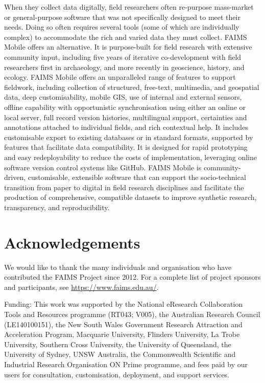 \documentclass[preprint,12pt, a4paper]{elsarticle}
\begin{document}
When they collect data digitally, field researchers often re-purpose mass-market or general-purpose software that was not specifically designed to meet their needs. Doing so often requires several tools (some of which are individually complex) to accommodate the rich and varied data they must collect. FAIMS Mobile offers an alternative. It is purpose-built for field research with extensive community input, including five years of iterative co-development with field researchers first in archaeology, and more recently in geoscience, history, and ecology. FAIMS Mobile offers an unparalleled range of features to support fieldwork, including collection of structured, free-text, multimedia, and geospatial data, deep customisability, mobile GIS, use of internal and external sensors, offline capability with opportunistic synchronisation using either an online or local server, full record version histories, multilingual support, certainties and annotations attached to individual fields, and rich contextual help. It includes customisable export to existing databases or in standard formats, supported by features that facilitate data compatibility. It is designed for rapid prototyping and easy redeployability to reduce the costs of implementation, leveraging online software version control systems like GitHub. FAIMS Mobile is community-driven, customisable, extensible software that can support the socio-technical transition from paper to digital in field research disciplines and facilitate the production of comprehensive, compatible datasets to improve synthetic research, transparency, and reproducibility.  


\appendix


\section*{Acknowledgements}


We would like to thank the many individuals and organisation who have contributed the FAIMS Project since 2012. For a complete list of project sponsors and participants, see \url{https://www.faims.edu.au/}.

Funding: This work was supported by the National eResearch Collaboration Tools and Resources programme (RT043; V005), the Australian Research Council (LE140100151), the New South Wales Government Research Attraction and Acceleration Program, Macquarie University, Flinders University, La Trobe University, Southern Cross University, the University of Queensland, the University of Sydney, UNSW Australia, the Commonwealth Scientific and Industrial Research Organisation ON Prime programme, and fees paid by our users for consultation, customisation, deployment, and support services.
\end{document}
